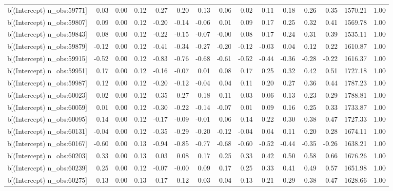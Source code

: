 \begin{table}[ht]
\begin{tabular}{rrrrrrrrrrrrrrr}
  b[(Intercept) n\_obs:59771] & 0.03 & 0.00 & 0.12 & -0.27 & -0.20 & -0.13 & -0.06 & 0.02 & 0.11 & 0.18 & 0.26 & 0.35 & 1570.21 & 1.00 \\ 
  b[(Intercept) n\_obs:59807] & 0.09 & 0.00 & 0.12 & -0.20 & -0.14 & -0.06 & 0.01 & 0.09 & 0.17 & 0.25 & 0.32 & 0.41 & 1569.78 & 1.00 \\ 
  b[(Intercept) n\_obs:59843] & 0.08 & 0.00 & 0.12 & -0.22 & -0.15 & -0.07 & -0.00 & 0.08 & 0.17 & 0.24 & 0.31 & 0.39 & 1535.11 & 1.00 \\ 
  b[(Intercept) n\_obs:59879] & -0.12 & 0.00 & 0.12 & -0.41 & -0.34 & -0.27 & -0.20 & -0.12 & -0.03 & 0.04 & 0.12 & 0.22 & 1610.87 & 1.00 \\ 
  b[(Intercept) n\_obs:59915] & -0.52 & 0.00 & 0.12 & -0.83 & -0.76 & -0.68 & -0.61 & -0.52 & -0.44 & -0.36 & -0.28 & -0.22 & 1616.37 & 1.00 \\ 
  b[(Intercept) n\_obs:59951] & 0.17 & 0.00 & 0.12 & -0.16 & -0.07 & 0.01 & 0.08 & 0.17 & 0.25 & 0.32 & 0.42 & 0.51 & 1727.18 & 1.00 \\ 
  b[(Intercept) n\_obs:59987] & 0.12 & 0.00 & 0.12 & -0.20 & -0.12 & -0.04 & 0.04 & 0.11 & 0.20 & 0.27 & 0.36 & 0.44 & 1787.23 & 1.00 \\ 
  b[(Intercept) n\_obs:60023] & -0.02 & 0.00 & 0.12 & -0.35 & -0.27 & -0.18 & -0.11 & -0.03 & 0.06 & 0.13 & 0.23 & 0.29 & 1788.81 & 1.00 \\ 
  b[(Intercept) n\_obs:60059] & 0.01 & 0.00 & 0.12 & -0.30 & -0.22 & -0.14 & -0.07 & 0.01 & 0.09 & 0.16 & 0.25 & 0.33 & 1733.87 & 1.00 \\ 
  b[(Intercept) n\_obs:60095] & 0.14 & 0.00 & 0.12 & -0.17 & -0.09 & -0.01 & 0.06 & 0.14 & 0.22 & 0.30 & 0.38 & 0.47 & 1727.33 & 1.00 \\ 
  b[(Intercept) n\_obs:60131] & -0.04 & 0.00 & 0.12 & -0.35 & -0.29 & -0.20 & -0.12 & -0.04 & 0.04 & 0.11 & 0.20 & 0.28 & 1674.11 & 1.00 \\ 
  b[(Intercept) n\_obs:60167] & -0.60 & 0.00 & 0.13 & -0.94 & -0.85 & -0.77 & -0.68 & -0.60 & -0.52 & -0.44 & -0.35 & -0.26 & 1638.21 & 1.00 \\ 
  b[(Intercept) n\_obs:60203] & 0.33 & 0.00 & 0.13 & 0.03 & 0.08 & 0.17 & 0.25 & 0.33 & 0.42 & 0.50 & 0.58 & 0.66 & 1676.26 & 1.00 \\ 
  b[(Intercept) n\_obs:60239] & 0.25 & 0.00 & 0.12 & -0.07 & -0.00 & 0.09 & 0.17 & 0.25 & 0.33 & 0.41 & 0.49 & 0.57 & 1651.98 & 1.00 \\ 
  b[(Intercept) n\_obs:60275] & 0.13 & 0.00 & 0.13 & -0.17 & -0.12 & -0.03 & 0.04 & 0.13 & 0.21 & 0.29 & 0.38 & 0.47 & 1628.66 & 1.00 \\ 

\end{tabular}
\end{table}
